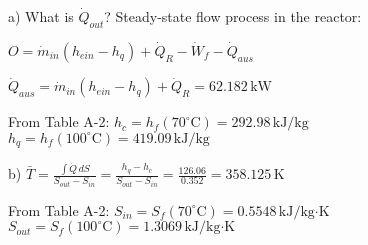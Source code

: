 a)  
What is \( \dot{Q}_{out} \)?  
Steady-state flow process in the reactor:  

\( O = \dot{m}_{in} (h_{ein} - h_{q}) + \dot{Q}_R - \dot{W}_f - \dot{Q}_{aus} \)  

\( \dot{Q}_{aus} = \dot{m}_{in} (h_{ein} - h_{q}) + \dot{Q}_R = 62.182 \, \text{kW} \)  

From Table A-2:  
\( h_c = h_f(70^\circ \text{C}) = 292.98 \, \text{kJ/kg} \)  
\( h_q = h_f(100^\circ \text{C}) = 419.09 \, \text{kJ/kg} \)  

b)  
\( \bar{T} = \frac{\int \dot{Q} \, dS}{S_{out} - S_{in}} = \frac{h_q - h_c}{S_{out} - S_{in}} = \frac{126.06}{0.352} = 358.125 \, \text{K} \)  

From Table A-2:  
\( S_{in} = S_f(70^\circ \text{C}) = 0.5548 \, \text{kJ/kg·K} \)  
\( S_{out} = S_f(100^\circ \text{C}) = 1.3069 \, \text{kJ/kg·K} \)